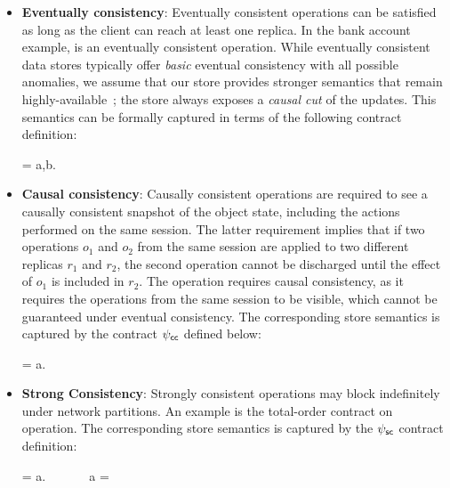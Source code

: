 \begin{itemize}
\setlength{\itemsep}{2pt}

\item \textbf{Eventually consistency}: Eventually consistent operations can
	be satisfied as long as the client can reach at least one replica. In the
	bank account example,  is an eventually consistent operation.
	While eventually consistent data stores typically offer \emph{basic} eventual
	consistency with all possible anomalies, we assume that our store provides
	stronger semantics that remain highly-available~\cite{BailisHAT,COPS}; the
	store always exposes a \emph{causal cut} of the updates. This semantics can
	be formally captured in terms of the following contract definition:

  \vspace{-1.5em}
  \begin{smathpar}
  \ecc = \forall a,b. ~ \wedge {} \Rightarrow {}
  \end{smathpar}

\item \textbf{Causal consistency}: Causally consistent operations are required
	to see a causally consistent snapshot of the object state, including the
	actions performed on the same session.  The latter requirement implies that
	if two operations $o_1$ and $o_2$ from the same session are applied to two
	different replicas $r_1$ and $r_2$, the second operation cannot be discharged
	until the effect of $o_1$ is included in $r_2$. The  operation
	requires causal consistency, as it requires the operations from the same
	session to be visible, which cannot be guaranteed under eventual consistency.
	The corresponding store semantics is captured by the contract $\psi_{\sf cc}$ defined
	below:

  \vspace{-1.5em}
  \begin{smathpar}
  \ccc = \forall a.~ \Rightarrow {}
  \end{smathpar}

\item \textbf{Strong Consistency}: Strongly consistent operations may block
  indefinitely under network partitions. An example is the total-order
  contract on  operation. The corresponding store semantics is
	captured by the $\psi_{\sf sc}$ contract definition:

  \vspace{-1.5em}
  \begin{smathpar}
  \scc = \forall a.~ \Rightarrow {} ~\vee~  ~\vee~ a = \cureff
  \end{smathpar}
\end{itemize}
\vspace{-1em}

